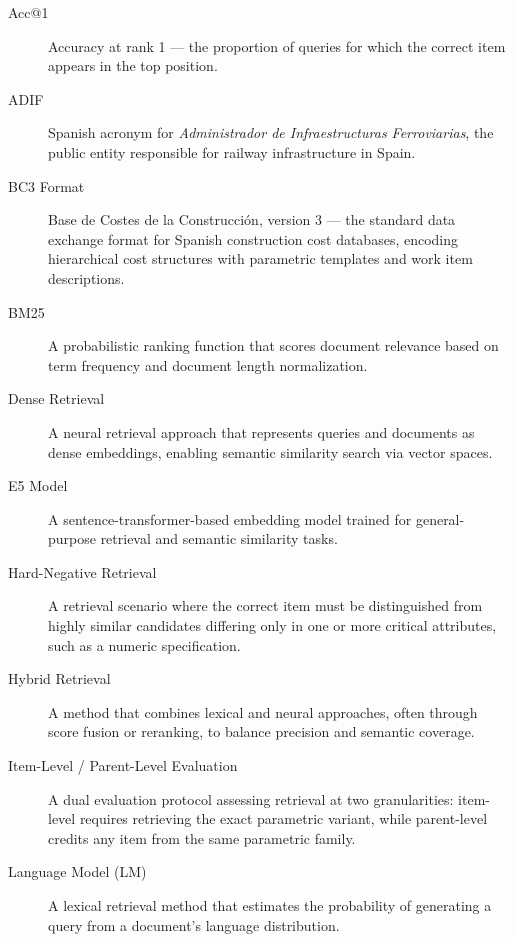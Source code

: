 \documentclass[preprint,12pt]{elsarticle}
\begin{document}
\begin{description}

    \item[Acc@1] Accuracy at rank 1 --- the proportion of queries for which the correct item appears in the top position.
 
    \item[ADIF] Spanish acronym for \textit{Administrador de Infraestructuras Ferroviarias}, the public entity responsible for railway infrastructure in Spain.

    \item[BC3 Format] Base de Costes de la Construcción, version 3 --- the standard data exchange format for Spanish construction cost databases, encoding hierarchical cost structures with parametric templates and work item descriptions.

    \item[BM25] A probabilistic ranking function that scores document relevance based on term frequency and document length normalization.

    \item[Dense Retrieval] A neural retrieval approach that represents queries and documents as dense embeddings, enabling semantic similarity search via vector spaces.

    \item[E5 Model] A sentence-transformer-based embedding model trained for general-purpose retrieval and semantic similarity tasks.
    
    \item[Hard-Negative Retrieval] A retrieval scenario where the correct item must be distinguished from highly similar candidates differing only in one or more critical attributes, such as a numeric specification.

    \item[Hybrid Retrieval] A method that combines lexical and neural approaches, often through score fusion or reranking, to balance precision and semantic coverage.

    \item[Item-Level / Parent-Level Evaluation] A dual evaluation protocol assessing retrieval at two granularities: item-level requires retrieving the exact parametric variant, while parent-level credits any item from the same parametric family.
    
    \item[Language Model (LM)] A lexical retrieval method that estimates the probability of generating a query from a document's language distribution.
    

\end{description}
\end{document}
